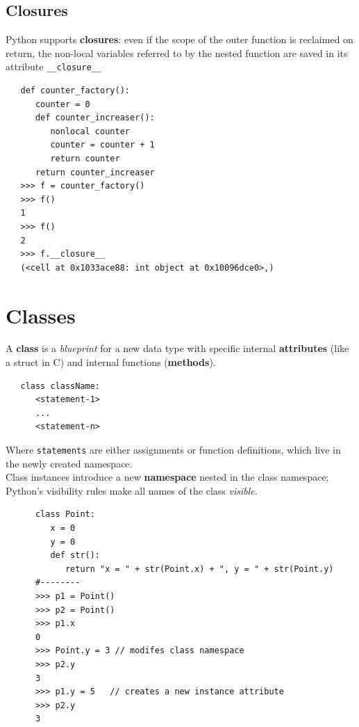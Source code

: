 \subsection{Closures}
Python supports \textbf{closures}: 
even if the scope of the
outer function is reclaimed on return, the non-local variables referred to by the nested function are saved
in its attribute \lstinline|__closure__|

\begin{lstlisting}
   def counter_factory():
      counter = 0
      def counter_increaser():
         nonlocal counter
         counter = counter + 1
         return counter
      return counter_increaser
   >>> f = counter_factory()
   >>> f()
   1
   >>> f()
   2
   >>> f.__closure__
   (<cell at 0x1033ace88: int object at 0x10096dce0>,)
\end{lstlisting}


\section{Classes}


A \textbf{class} is a \textit{blueprint} for a new data type with specific internal \textbf{attributes}
(like a struct in C) and internal functions (\textbf{methods}).

\begin{lstlisting}
   class className:
      <statement-1>
      ...
      <statement-n>
\end{lstlisting}
\begin{paracol}{2}
   
   \colfill
   Where \lstinline|statements| are either assignments or function definitions, which live in the newly created namespace.\\
   Class instances introduce a new \textbf{namespace} nested in the class
   namespace; 
   Python's visibility rules make all names of the class \textit{visible}.
   \colfill

   \switchcolumn

   \begin{lstlisting}
      class Point:
         x = 0
         y = 0
         def str():
            return "x = " + str(Point.x) + ", y = " + str(Point.y)
      #--------
      >>> p1 = Point()
      >>> p2 = Point()
      >>> p1.x
      0
      >>> Point.y = 3 // modifes class namespace
      >>> p2.y
      3
      >>> p1.y = 5   // creates a new instance attribute
      >>> p2.y
      3
   \end{lstlisting}
\end{paracol}

